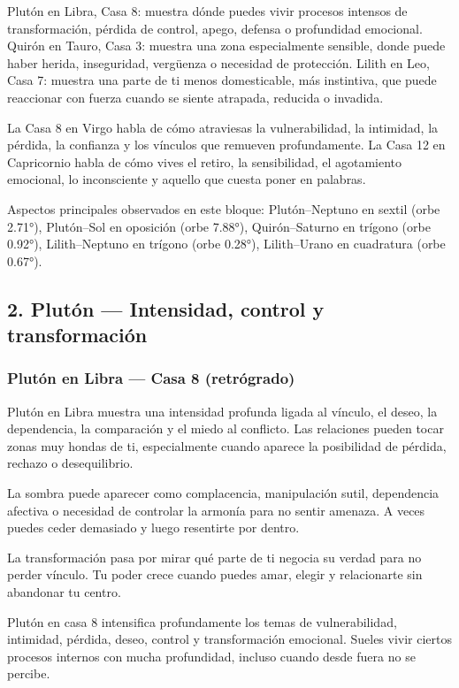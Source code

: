 \documentclass[11pt,a4paper]{article}
\begin{document}
Plutón en Libra, Casa 8: muestra dónde puedes vivir procesos intensos de transformación, pérdida de control, apego, defensa o profundidad emocional.
Quirón en Tauro, Casa 3: muestra una zona especialmente sensible, donde puede haber herida, inseguridad, vergüenza o necesidad de protección.
Lilith en Leo, Casa 7: muestra una parte de ti menos domesticable, más instintiva, que puede reaccionar con fuerza cuando se siente atrapada, reducida o invadida.

La Casa 8 en Virgo habla de cómo atraviesas la vulnerabilidad, la intimidad, la pérdida, la confianza y los vínculos que remueven profundamente.
La Casa 12 en Capricornio habla de cómo vives el retiro, la sensibilidad, el agotamiento emocional, lo inconsciente y aquello que cuesta poner en palabras.

Aspectos principales observados en este bloque: Plutón–Neptuno en sextil (orbe 2.71°), Plutón–Sol en oposición (orbe 7.88°), Quirón–Saturno en trígono (orbe 0.92°), Lilith–Neptuno en trígono (orbe 0.28°), Lilith–Urano en cuadratura (orbe 0.67°).

\vspace{0.4cm}

\subsection{2. Plutón — Intensidad, control y transformación}

\subsubsection*{Plutón en Libra — Casa 8 (retrógrado)}

Plutón en Libra muestra una intensidad profunda ligada al vínculo, el deseo, la dependencia, la comparación y el miedo al conflicto. Las relaciones pueden tocar zonas muy hondas de ti, especialmente cuando aparece la posibilidad de pérdida, rechazo o desequilibrio.

La sombra puede aparecer como complacencia, manipulación sutil, dependencia afectiva o necesidad de controlar la armonía para no sentir amenaza. A veces puedes ceder demasiado y luego resentirte por dentro.

La transformación pasa por mirar qué parte de ti negocia su verdad para no perder vínculo. Tu poder crece cuando puedes amar, elegir y relacionarte sin abandonar tu centro.

Plutón en casa 8 intensifica profundamente los temas de vulnerabilidad, intimidad, pérdida, deseo, control y transformación emocional. Sueles vivir ciertos procesos internos con mucha profundidad, incluso cuando desde fuera no se percibe.
\end{document}
